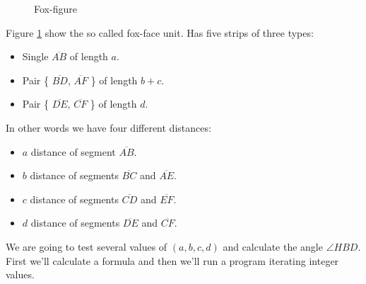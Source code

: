 \documentclass[11pt]{article}
\begin{document}
\begin{figure}[htb]
\caption{Fox-figure}
\label{fig:fox-face}
\end{figure}

Figure \ref{fig:fox-face} show the so called fox-face unit.
Has five strips of three types:
\begin{itemize}
\item Single $\overline{AB}$ of length $a$.
\item Pair \{ $\overline{BD}$, $\overline{AF}$ \} of length $b+c$.
\item Pair \{ $\overline{DE}$, $\overline{CF}$ \} of length $d$.
\end{itemize}
In other words we have four different distances:
\begin{itemize}
\item $a$ distance of segment $\overline{AB}$.
\item $b$ distance of segments $\overline{BC}$ and $\overline{AE}$.
\item $c$ distance of segments $\overline{CD}$ and $\overline{EF}$.
\item $d$ distance of segments $\overline{DE}$ and $\overline{CF}$.
\end{itemize}
We are going to test several values of $(a,b,c,d)$ and calculate the angle $\angle{HBD}$.
First we'll calculate a formula and then we'll run a program iterating integer values.
\end{document}

